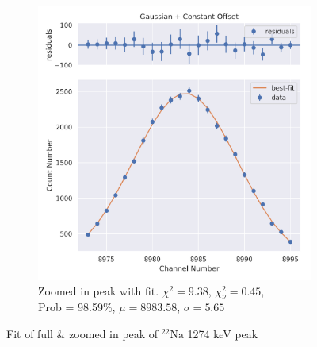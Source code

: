 \documentclass[11pt,a4paper]{article}
\newcommand{\element}[2]{$^{#2}\textrm{#1}$}
\begin{document}
\begin{figure}[H]
\begin{subfigure}{.48\linewidth}
    \includegraphics[width=\linewidth]{./Images/Sodium22/Gauss/Gauss_2_Zoom.png}
    \caption{Zoomed in peak with fit. $\chi^2 = 9.38$, $\chi^2_\nu = 0.45$, \\ Prob = 98.59\%, $\mu = 8983.58$, $\sigma = 5.65$}
  \end{subfigure}
  \caption{Fit of full \& zoomed in peak of \element{Na}{22} 1274 keV peak}
\end{figure}
\clearpage
\end{document}
